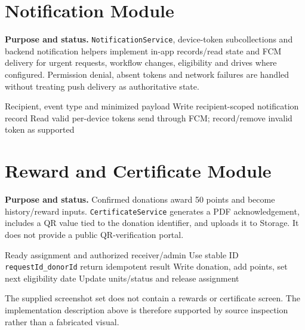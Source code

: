 \section{Notification Module}
\textbf{Purpose and status.} \texttt{NotificationService}, device-token subcollections and backend notification helpers implement in-app records/read state and FCM delivery for urgent requests, workflow changes, eligibility and drives where configured. Permission denial, absent tokens and network failures are handled without treating push delivery as authoritative state.
\begin{algorithm}[H]\caption{Dispatch a notification}\begin{algorithmic}[1]
\Require Recipient, event type and minimized payload
\State Write recipient-scoped notification record
\State Read valid per-device tokens
 \State send through FCM; record/remove invalid token as supported \EndFor
\end{algorithmic}\end{algorithm}

\section{Reward and Certificate Module}
\textbf{Purpose and status.} Confirmed donations award 50 points and become history/reward inputs. \texttt{CertificateService} generates a PDF acknowledgement, includes a QR value tied to the donation identifier, and uploads it to Storage. It does not provide a public QR-verification portal.
\begin{algorithm}[H]\caption{Confirm donation and derive reward}\begin{algorithmic}[1]
\Require Ready assignment and authorized receiver/admin
\State Use stable ID \texttt{requestId\_donorId}
 \State return idempotent result \EndIf
\State Write donation, add points, set next eligibility date
\State Update units/status and release assignment
\end{algorithmic}\end{algorithm}
The supplied screenshot set does not contain a rewards or certificate screen. The implementation description above is therefore supported by source inspection rather than a fabricated visual.

